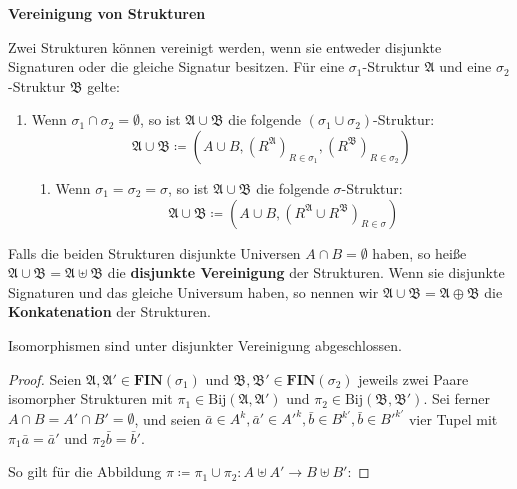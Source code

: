\begin{defn}
\textbf{\label{def:disjoint-union}Vereinigung von Strukturen}

Zwei Strukturen können vereinigt werden, wenn sie entweder disjunkte
Signaturen oder die gleiche Signatur besitzen. Für eine $\sigma_{1}$-Struktur
$\mathfrak{A}$ und eine $\sigma_{2}$-Struktur $\mathfrak{B}$ gelte:

\end{defn}
\begin{enumerate}
\item Wenn $\sigma_{1}\cap\sigma_{2}=\emptyset$, so ist $\mathfrak{A}\cup\mathfrak{B}$
die folgende $\left(\sigma_{1}\cup\sigma_{2}\right)$-Struktur:
\[
\mathfrak{A}\cup\mathfrak{B}\coloneqq\left(A\cup B,\left(R^{\mathfrak{A}}\right)_{R\in\sigma_{1}},\left(R^{\mathfrak{B}}\right)_{R\in\sigma_{2}}\right)
\]

\begin{enumerate}
\item Wenn $\sigma_{1}=\sigma_{2}=\sigma$, so ist $\mathfrak{A}\cup\mathfrak{B}$
die folgende $\sigma$-Struktur:
\[
\mathfrak{A}\cup\mathfrak{B}\coloneqq\left(A\cup B,\left(R^{\mathfrak{A}}\cup R^{\mathfrak{B}}\right)_{R\in\sigma}\right)
\]
\end{enumerate}
\end{enumerate}
\begin{defn}
Falls die beiden Strukturen disjunkte Universen $A\cap B=\emptyset$
haben, so heiße $\mathfrak{A}\cup\mathfrak{B}=\mathfrak{A}\uplus\mathfrak{B}$
die \textbf{disjunkte Vereinigung} der Strukturen. Wenn sie disjunkte
Signaturen und das gleiche Universum haben, so nennen wir $\mathfrak{A}\cup\mathfrak{B}=\mathfrak{A}\oplus\mathfrak{B}$
die \textbf{Konkatenation} der Strukturen.
\end{defn}
\begin{prop}
\label{prop:iso-closed-disjoint}Isomorphismen sind unter disjunkter
Vereinigung abgeschlossen.
\end{prop}
\begin{proof}
Seien $\mathfrak{A},\mathfrak{A}'\in\mathbf{FIN}\left(\sigma_{1}\right)$
und $\mathfrak{B},\mathfrak{B}'\in\mathbf{FIN}\left(\sigma_{2}\right)$
jeweils zwei Paare isomorpher Strukturen mit $\pi_{1}\in\mathrm{Bij}\left(\mathfrak{A},\mathfrak{A}'\right)$
und $\pi_{2}\in\mathrm{Bij}\left(\mathfrak{B},\mathfrak{B}'\right)$.
Sei ferner $A\cap B=A'\cap B'=\emptyset$, und seien $\bar{a}\in A^{k},\bar{a}'\in A'^{k},\bar{b}\in B^{k'},\bar{b}\in B'^{k'}$
vier Tupel mit $\pi_{1}\bar{a}=\bar{a}'$ und $\pi_{2}\bar{b}=\bar{b}'$.

So gilt für die Abbildung $\pi\coloneqq\pi_{1}\cup\pi_{2}:A\uplus A'\rightarrow B\uplus B'$:

\end{proof}

